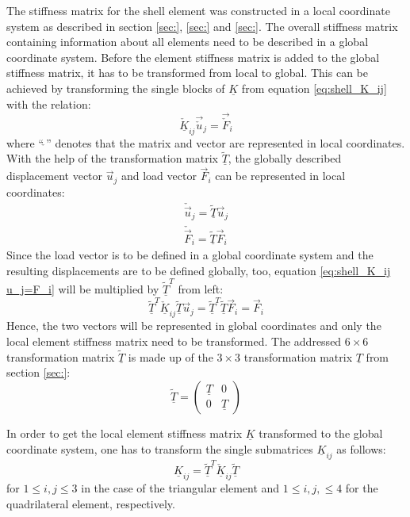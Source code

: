  The stiffness matrix for the shell element was constructed in a local coordinate system as described in section \ref{sec:}, \ref{sec:} and \ref{sec:}. The overall stiffness matrix containing information about all elements need to be described in a global coordinate system. Before the element stiffness matrix is added to the global stiffness matrix, it has to be transformed from local to global. This can be achieved by transforming the single blocks of $\underline{K}$ from equation \ref{eq:shell_K_ij} with the relation:
 \begin{equation}\label{eq:shell_K_ij u_j=F_i}
 \underline{\check{K}}_{ij} \vec{\check{u}}_j = \vec{\check{F}}_i
 \end{equation}
 where ``\;$\check{\ }$\;'' denotes that the matrix and vector are represented in local coordinates. With the help of the transformation matrix $\underline{\tilde{T}}$, the globally described displacement vector $\vec{u}_j$ and load vector $\vec{F}_i$ can be represented in local coordinates:
 \begin{align}
 \check{\vec{u}}_j = \underline{\tilde{T}} \vec{u}_j\\
 \check{\vec{F}}_i = \underline{\tilde{T}} \vec{F}_i
 \end{align}
 Since the load vector is to be defined in a global coordinate system and the resulting displacements are to be defined globally, too, equation \ref{eq:shell_K_ij u_j=F_i} will be multiplied by $\underline{\tilde{T}}^T$ from left:
 \begin{equation}
 \underline{\tilde{T}}^T \underline{\check{K}}_{ij} \underline{\tilde{T}} \vec{u}_j = \underline{\tilde{T}}^T \underline{\tilde{T}} \vec{F}_i = \vec{F}_i
 \end{equation}
 Hence, the two vectors will be represented in global coordinates and only the local element stiffness matrix need to be transformed. The addressed $6\!\times\!6$ transformation matrix $\underline{\tilde{T}}$ is made up of the $3\!\times\!3$ transformation matrix $\underline{T}$ from section \ref{sec:}:
 \begin{equation}
 \underline{\tilde{T}} = \begin{pmatrix}
 \underline{T} & 0\\
 0 & \underline{T}
 \end{pmatrix}
 \end{equation}
 
 In order to get the local element stiffness matrix $\underline{K}$ transformed to the global coordinate system, one has to transform the single submatrices $\underline{K}_{ij}$ as follows:
 \begin{equation}
 \underline{K}_{ij} = \underline{\tilde{T}}^T \underline{\check{K}}_{ij} \underline{\tilde{T}}
 \end{equation}
 for $1 \leq i,j \leq 3$ in the case of the triangular element and $1 \leq i,j, \leq 4$ for the quadrilateral element, respectively.
 \newpage